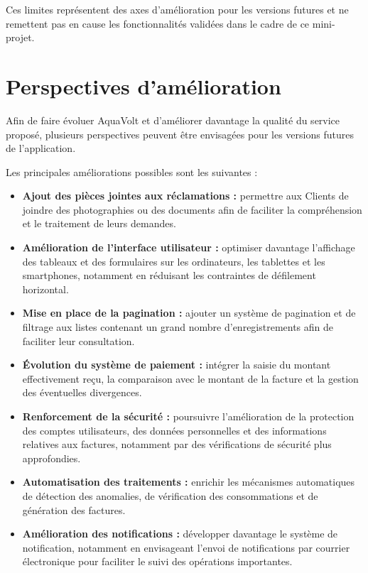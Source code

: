 Ces limites représentent des axes d'amélioration pour les versions futures et ne remettent pas en cause les fonctionnalités validées dans le cadre de ce mini-projet.

\section{Perspectives d'amélioration}

Afin de faire évoluer AquaVolt et d'améliorer davantage la qualité du service proposé, plusieurs perspectives peuvent être envisagées pour les versions futures de l'application.

Les principales améliorations possibles sont les suivantes :

\begin{itemize}
    \item \textbf{Ajout des pièces jointes aux réclamations :} permettre aux Clients de joindre des photographies ou des documents afin de faciliter la compréhension et le traitement de leurs demandes.

    \item \textbf{Amélioration de l'interface utilisateur :} optimiser davantage l'affichage des tableaux et des formulaires sur les ordinateurs, les tablettes et les smartphones, notamment en réduisant les contraintes de défilement horizontal.

    \item \textbf{Mise en place de la pagination :} ajouter un système de pagination et de filtrage aux listes contenant un grand nombre d'enregistrements afin de faciliter leur consultation.

    \item \textbf{Évolution du système de paiement :} intégrer la saisie du montant effectivement reçu, la comparaison avec le montant de la facture et la gestion des éventuelles divergences.

    \item \textbf{Renforcement de la sécurité :} poursuivre l'amélioration de la protection des comptes utilisateurs, des données personnelles et des informations relatives aux factures, notamment par des vérifications de sécurité plus approfondies.

    \item \textbf{Automatisation des traitements :} enrichir les mécanismes automatiques de détection des anomalies, de vérification des consommations et de génération des factures.

    \item \textbf{Amélioration des notifications :} développer davantage le système de notification, notamment en envisageant l'envoi de notifications par courrier électronique pour faciliter le suivi des opérations importantes.


\end{itemize}
